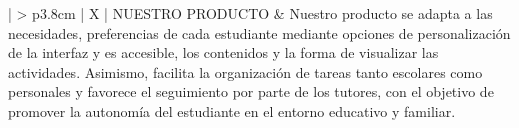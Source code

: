 \begin{xltabular}{\linewidth}{| >{\bfseries\sffamily\color{black}} p{3.8cm} | X |}
    NUESTRO    \newline  PRODUCTO & Nuestro producto se adapta a las necesidades, preferencias de cada estudiante mediante opciones de personalización de la interfaz y es accesible, los contenidos y la forma de visualizar las actividades. Asimismo, facilita la organización de tareas tanto escolares como personales y favorece el seguimiento por parte de los tutores, con el objetivo de promover la autonomía del estudiante en el entorno educativo y familiar. \\ \hline
\end{xltabular}
\endgroup